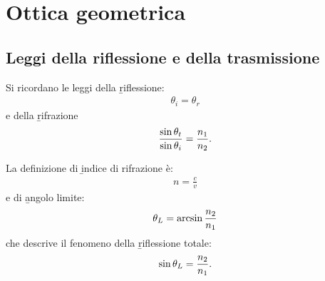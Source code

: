 \chapter{Ottica geometrica}%
\section{Leggi della riflessione e della trasmissione}%
Si ricordano le leggi della \b{riflessione}:
\begin{equation}\begin{split}
\theta_i=\theta_r
\end{split}\end{equation}
e della \b{rifrazione}
\begin{equation}\begin{split}
\frac{\sin{\theta_t}}{\sin{\theta_i}}=\frac{n_1}{n_2}.
\end{split}\end{equation}

La definizione di \b{indice di rifrazione} è:
\begin{equation}\begin{split}
n=\frac{c}{v}
\end{split}\end{equation}
e di \b{angolo limite}:
\begin{equation}\begin{split}
\theta_L=\arcsin{\frac{n_2}{n_1}}
\end{split}\end{equation}
che descrive il fenomeno della \b{riflessione totale}:
\begin{equation}\begin{split}
\sin{\theta_L}=\frac{n_2}{n_1}.
\end{split}\end{equation}

